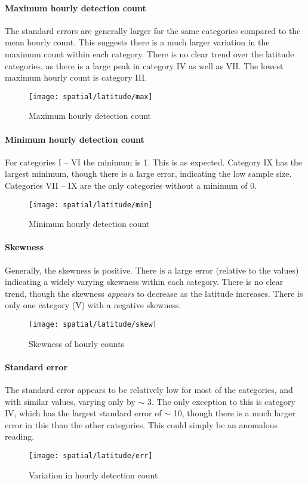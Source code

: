 \paragraph{Maximum hourly detection count\\}
The standard errors are generally larger for the same categories compared to the mean hourly count. This suggests there is a much larger variation in the maximum count within each category. There is no clear trend over the latitude categories, as there is a large peak in category IV as well as VII. The lowest maximum hourly count is category III.
\begin{figure}[h!]
	\centering
	\texttt{[image: spatial/latitude/max]}
	\caption{Maximum hourly detection count
		\label{fig:spat:lat:max}}
\end{figure}

\paragraph{Minimum hourly detection count\\}
For categories I -- VI the minimum is 1. This is as expected. Category IX has the largest minimum, though there is a large error, indicating the low sample size. Categories VII -- IX are the only categories without a minimum of 0. 
\begin{figure}[h!]
	\centering
	\texttt{[image: spatial/latitude/min]}
	\caption{Minimum hourly detection count
		\label{fig:spat:lat:min}}
\end{figure}
\paragraph{Skewness\\}
Generally, the skewness is positive. There is a large error (relative to the values) indicating a widely varying skewness within each category. There is no clear trend, though the skewness {\it appears} to decrease as the latitude increases. There is only one category (V) with a negative skewness.
\begin{figure}[h!]
	\centering
	\texttt{[image: spatial/latitude/skew]}
	\caption{Skewness of hourly counts
		\label{fig:spat:lat:skew}}
\end{figure}
\paragraph{Standard error\\}
The standard error appears to be relatively low for most of the categories, and with similar values, varying only by $\sim$ 3. The only exception to this is category IV, which has the largest standard error of $\sim$ 10, though there is a much larger error in this than the other categories. This could simply be an anomalous reading.
\begin{figure}[h!]
	\centering
	\texttt{[image: spatial/latitude/err]}
	\caption{Variation in hourly detection count 
		\label{fig:spat:lat:err}}
\end{figure}
